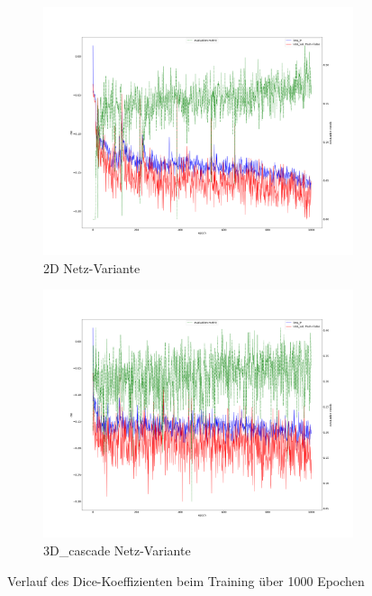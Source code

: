 \begin{figure}[H]
\centering
\begin{minipage}{.5\textwidth}
\begin{subfigure}{\textwidth}
\centering
\includegraphics[width=\textwidth]{Pictures/nnUnet/Praxis/Task109-CT/progress_109-CT_2d.png}
\caption{2D Netz-Variante}
\label{pic:Prog_109-2d}
\end{subfigure}
\end{minipage}%
\begin{minipage}{.5\textwidth}
\begin{subfigure}{\textwidth}
\includegraphics[width=\textwidth]{Pictures/nnUnet/Praxis/Task109-CT/progress_109-CT_3d_cascade_fullres.png}
\caption{3D\_cascade Netz-Variante}
\label{pic:Prog_109-cascade}
\end{subfigure}
\end{minipage}

\caption{Verlauf des Dice-Koeffizienten beim Training über 1000 Epochen}
\label{pic:Prog_109-A}
\end{figure}

